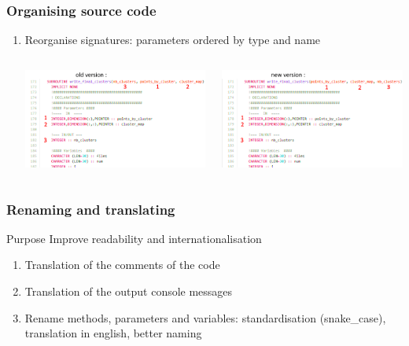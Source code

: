 \documentclass[10p]{beamer}
\begin{document}
\begin{frame}
\frametitle{Organising source code}
\begin{enumerate}
\item Reorganise signatures: parameters ordered by type and name
\begin{columns}
\begin{column}{150 pt}
\includegraphics[scale=0.35]{Image/before_reoganize.png}
\end{column}
\begin{column}{150 pt}
\includegraphics[scale=0.35]{Image/after_reorganize.png}
\end{column}
\end{columns}
\end{enumerate}
\end{frame}

\begin{frame}
\frametitle{Renaming and translating}
\begin{block}{Purpose}
Improve readability and internationalisation
\end{block}
\begin{enumerate}
\item Translation of the comments of the code
\item Translation of the output console messages
\item Rename methods, parameters and variables: standardisation (snake\_case), translation in english, better naming
\end{enumerate}
\end{frame}
\end{document}
